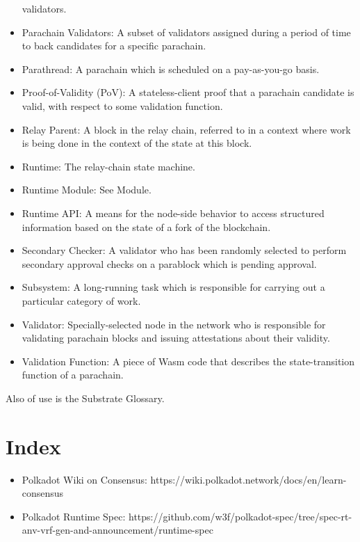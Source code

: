 \begin{itemize}
    validators.
    \item Parachain Validators: A subset of validators assigned during a period
    of time to back candidates for a specific parachain.
    \item Parathread: A parachain which is scheduled on a pay-as-you-go basis.
    \item Proof-of-Validity (PoV): A stateless-client proof that a parachain
    candidate is valid, with respect to some validation function.
    \item Relay Parent: A block in the relay chain, referred to in a context
    where work is being done in the context of the state at this block.
    \item Runtime: The relay-chain state machine.
    \item Runtime Module: See Module.
    \item Runtime API: A means for the node-side behavior to access structured
    information based on the state of a fork of the blockchain.
    \item Secondary Checker: A validator who has been randomly selected to
    perform secondary approval checks on a parablock which is pending approval.
    \item Subsystem: A long-running task which is responsible for carrying out a
    particular category of work.
    \item Validator: Specially-selected node in the network who is responsible
    for validating parachain blocks and issuing attestations about their
    validity.
    \item Validation Function: A piece of Wasm code that describes the
    state-transition function of a parachain.
\end{itemize}

Also of use is the Substrate Glossary.

\section{Index}

\begin{itemize}
    \item Polkadot Wiki on Consensus:
    https://wiki.polkadot.network/docs/en/learn-consensus
    \item Polkadot Runtime Spec:
    https://github.com/w3f/polkadot-spec/tree/spec-rt-anv-vrf-gen-and-announcement/runtime-spec
\end{itemize}
